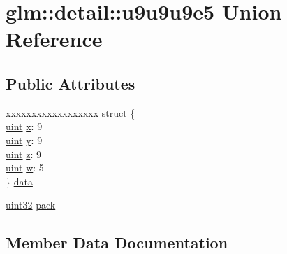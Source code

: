 \hypertarget{unionglm_1_1detail_1_1u9u9u9e5}{}\section{glm\+:\+:detail\+:\+:u9u9u9e5 Union Reference}
\label{unionglm_1_1detail_1_1u9u9u9e5}
\subsection*{Public Attributes}
\begin{DoxyCompactItemize}
\item 
\begin{tabbing}
xx\=xx\=xx\=xx\=xx\=xx\=xx\=xx\=xx\=\kill
struct \{\\
\>\hyperlink{group__core__precision_ga4fd29415871152bfb5abd588334147c8}{uint} \hyperlink{unionglm_1_1detail_1_1u9u9u9e5_a6cca809221a0d479ce9878bfca62ad49}{x}: 9\\
\>\hyperlink{group__core__precision_ga4fd29415871152bfb5abd588334147c8}{uint} \hyperlink{unionglm_1_1detail_1_1u9u9u9e5_ae11f1138214a146e8462f2c022350254}{y}: 9\\
\>\hyperlink{group__core__precision_ga4fd29415871152bfb5abd588334147c8}{uint} \hyperlink{unionglm_1_1detail_1_1u9u9u9e5_a9eacfe6494175ce78b6e516746bb63b7}{z}: 9\\
\>\hyperlink{group__core__precision_ga4fd29415871152bfb5abd588334147c8}{uint} \hyperlink{unionglm_1_1detail_1_1u9u9u9e5_afadc52b82254e8969b5e83601309f668}{w}: 5\\
\} \hyperlink{unionglm_1_1detail_1_1u9u9u9e5_ab27d3c628cb4c4f6c635de506bb1dc60}{data}\\

\end{tabbing}\item 
\hyperlink{namespaceglm_1_1detail_ade6cfbf377022aaa391af8cd50489222}{uint32} \hyperlink{unionglm_1_1detail_1_1u9u9u9e5_a76c0b28299b57da27b9e023091ae9c32}{pack}
\end{DoxyCompactItemize}


\subsection{Member Data Documentation}
\mbox{\label{unionglm_1_1detail_1_1u9u9u9e5_ab27d3c628cb4c4f6c635de506bb1dc60}} 
